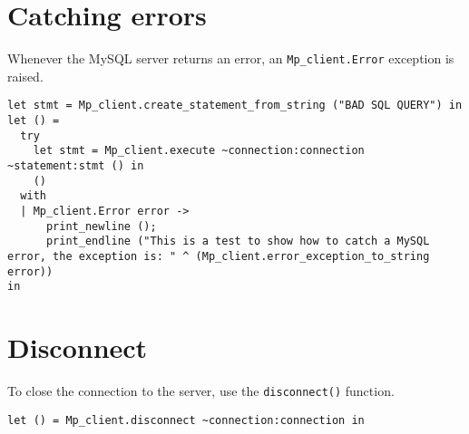 \documentclass[a4paper, english, 11pt]{article}
\begin{document}
\section{Catching errors}

Whenever the MySQL server returns an error, an \texttt{Mp\_client.Error} exception is raised.

\begin{lstlisting}
let stmt = Mp_client.create_statement_from_string ("BAD SQL QUERY") in
let () =
  try
    let stmt = Mp_client.execute ~connection:connection ~statement:stmt () in 
    ()
  with
  | Mp_client.Error error ->
      print_newline ();
      print_endline ("This is a test to show how to catch a MySQL error, the exception is: " ^ (Mp_client.error_exception_to_string error))
in
\end{lstlisting}

\section{Disconnect}

To close the connection to the server, use the \texttt{disconnect()} function.

\begin{lstlisting}
let () = Mp_client.disconnect ~connection:connection in
\end{lstlisting}
\end{document}
